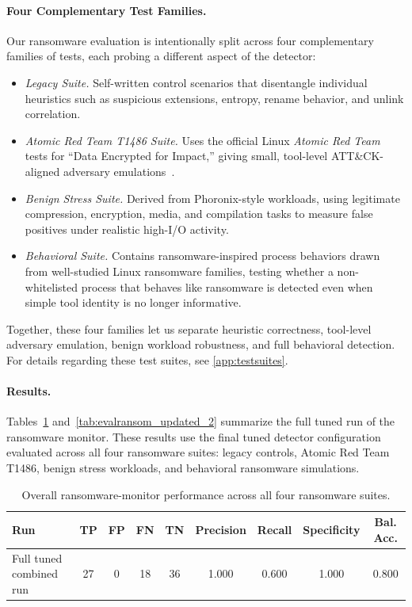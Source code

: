 \documentclass[twocolumn, 10pt]{scrartcl}
\begin{document}
\paragraph{Four Complementary Test Families.}
Our ransomware evaluation is intentionally split across four complementary families 
of tests, each probing a different aspect of the detector:
\begin{itemize}
    \item \textit{Legacy Suite.} Self-written control scenarios that disentangle 
    individual heuristics such as suspicious extensions, entropy, rename behavior, 
    and unlink correlation.
    
    \item \textit{Atomic Red Team T1486 Suite.} Uses the official Linux 
    \emph{Atomic Red Team} tests for ``Data Encrypted for Impact,'' giving 
    small, tool-level ATT\&CK-aligned adversary emulations~\cite{atomic_red_team_T1486}.
    
    \item \textit{Benign Stress Suite.} Derived from Phoronix-style workloads, 
    using legitimate compression, encryption, media, and compilation tasks to 
    measure false positives under realistic high-I/O activity.
    
    \item \textit{Behavioral Suite.} Contains ransomware-inspired process behaviors 
    drawn from well-studied Linux ransomware families, testing whether a 
    non-whitelisted process that behaves like ransomware is detected even when 
    simple tool identity is no longer informative.
\end{itemize}
Together, these four families let us separate heuristic correctness, tool-level 
adversary emulation, benign workload robustness, and full behavioral detection. For details regarding these test suites, see \cref{app:testsuites}.

\paragraph{Results.}

Tables~\ref{tab:ransomware_tuned_overall} and~\ref{tab:evalransom_updated_2} summarize the full tuned run of the ransomware monitor. These results use the final tuned detector configuration evaluated across all four ransomware suites: legacy controls, Atomic Red Team T1486, benign stress workloads, and behavioral ransomware simulations.

\begin{table}[!ht]
    \centering
    \small
    \begin{tabular}{lcccccccc}
    \toprule
    \textbf{Run} & \textbf{TP} & \textbf{FP} & \textbf{FN} & \textbf{TN} & \textbf{Precision} & \textbf{Recall} & \textbf{Specificity} & \textbf{Bal. Acc.} \\
    \midrule
    Full tuned combined run & 27 & 0 & 18 & 36 & 1.000 & 0.600 & 1.000 & 0.800 \\
    \bottomrule
    \end{tabular}
    \caption{Overall ransomware-monitor performance across all four ransomware suites.}
    \label{tab:ransomware_tuned_overall}
\end{table}
\end{document}
